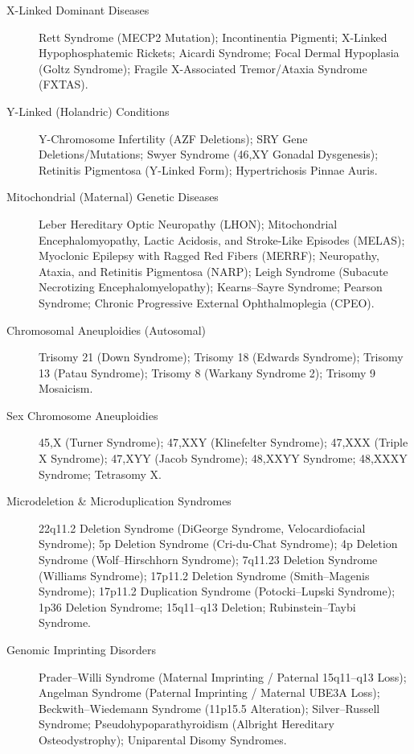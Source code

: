 \begin{description}
\item[X-Linked Dominant Diseases] Rett Syndrome (MECP2 Mutation); Incontinentia Pigmenti; X-Linked Hypophosphatemic Rickets; Aicardi Syndrome; Focal Dermal Hypoplasia (Goltz Syndrome); Fragile X-Associated Tremor/Ataxia Syndrome (FXTAS).

\item[Y-Linked (Holandric) Conditions] Y-Chromosome Infertility (AZF Deletions); SRY Gene Deletions/Mutations; Swyer Syndrome (46,XY Gonadal Dysgenesis); Retinitis Pigmentosa (Y-Linked Form); Hypertrichosis Pinnae Auris.

\item[Mitochondrial (Maternal) Genetic Diseases] Leber Hereditary Optic Neuropathy (LHON); Mitochondrial Encephalomyopathy, Lactic Acidosis, and Stroke-Like Episodes (MELAS); Myoclonic Epilepsy with Ragged Red Fibers (MERRF); Neuropathy, Ataxia, and Retinitis Pigmentosa (NARP); Leigh Syndrome (Subacute Necrotizing Encephalomyelopathy); Kearns–Sayre Syndrome; Pearson Syndrome; Chronic Progressive External Ophthalmoplegia (CPEO).

\item[Chromosomal Aneuploidies (Autosomal)] Trisomy 21 (Down Syndrome); Trisomy 18 (Edwards Syndrome); Trisomy 13 (Patau Syndrome); Trisomy 8 (Warkany Syndrome 2); Trisomy 9 Mosaicism.

\item[Sex Chromosome Aneuploidies] 45,X (Turner Syndrome); 47,XXY (Klinefelter Syndrome); 47,XXX (Triple X Syndrome); 47,XYY (Jacob Syndrome); 48,XXYY Syndrome; 48,XXXY Syndrome; Tetrasomy X.

\item[Microdeletion \& Microduplication Syndromes] 22q11.2 Deletion Syndrome (DiGeorge Syndrome, Velocardiofacial Syndrome); 5p Deletion Syndrome (Cri-du-Chat Syndrome); 4p Deletion Syndrome (Wolf–Hirschhorn Syndrome); 7q11.23 Deletion Syndrome (Williams Syndrome); 17p11.2 Deletion Syndrome (Smith–Magenis Syndrome); 17p11.2 Duplication Syndrome (Potocki–Lupski Syndrome); 1p36 Deletion Syndrome; 15q11–q13 Deletion; Rubinstein–Taybi Syndrome.

\item[Genomic Imprinting Disorders] Prader–Willi Syndrome (Maternal Imprinting / Paternal 15q11–q13 Loss); Angelman Syndrome (Paternal Imprinting / Maternal UBE3A Loss); Beckwith–Wiedemann Syndrome (11p15.5 Alteration); Silver–Russell Syndrome; Pseudohypoparathyroidism (Albright Hereditary Osteodystrophy); Uniparental Disomy Syndromes.


\end{description}
